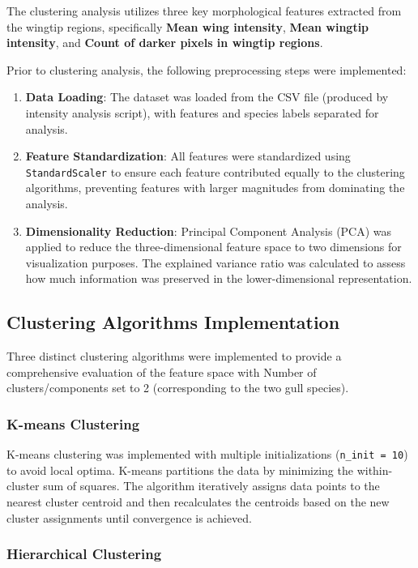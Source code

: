 \documentclass[a4paper,12pt]{report}
\begin{document}
The clustering analysis utilizes three key morphological features extracted from the wingtip regions, specifically \textbf{Mean wing intensity}, \textbf{Mean wingtip intensity}, and \textbf{Count of darker pixels in wingtip regions}.

Prior to clustering analysis, the following preprocessing steps were implemented:
\begin{enumerate}
    \item \textbf{Data Loading}: The dataset was loaded from the CSV file (produced by intensity analysis script), with features and species labels separated for analysis.
    \item \textbf{Feature Standardization}: All features were standardized using \texttt{StandardScaler} to ensure each feature contributed equally to the clustering algorithms, preventing features with larger magnitudes from dominating the analysis.
    \item \textbf{Dimensionality Reduction}: Principal Component Analysis (PCA) was applied to reduce the three-dimensional feature space to two dimensions for visualization purposes. The explained variance ratio was calculated to assess how much information was preserved in the lower-dimensional representation.
\end{enumerate}

\subsection{Clustering Algorithms Implementation}
Three distinct clustering algorithms were implemented to provide a comprehensive evaluation of the feature space with Number of clusters/components set to 2 (corresponding to the two gull species).

\subsubsection{K-means Clustering}
K-means clustering was implemented with multiple initializations (\texttt{n\_init = 10}) to avoid local optima.
K-means partitions the data by minimizing the within-cluster sum of squares. The algorithm iteratively assigns data points to the nearest cluster centroid and then recalculates the centroids based on the new cluster assignments until convergence is achieved.

\subsubsection{Hierarchical Clustering}
\end{document}
